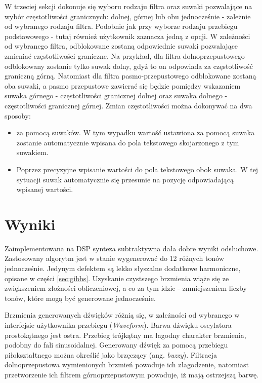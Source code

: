 W trzeciej sekcji dokonuje się wyboru rodzaju filtra oraz suwaki pozwalające na wybór częstotliwości granicznych: dolnej, górnej lub obu jednocześnie - zależnie od wybranego rodzaju filtra. Podobnie jak przy wyborze rodzaju przebiegu podstawowego - tutaj również użytkownik zaznacza jedną z opcji. W zależności od wybranego filtra, odblokowane zostaną odpowiednie suwaki pozwalające zmieniać częstotliwości graniczne. Na przykład, dla filtra dolnoprzepustowego odblokowany zostanie tylko suwak dolny, gdyż to on odpowiada za częstotliwość graniczną górną. Natomiast dla filtra pasmo-przepustowego odblokowane zostaną oba suwaki, a pasmo przepustowe zawierać się będzie pomiędzy wskazaniem suwaka górnego - częstotliwości granicznej dolnej oraz suwaka dolnego - częstotliwości granicznej górnej.
Zmian częstotliwości można dokonywać na dwa sposoby:
\begin{itemize}
	\item za pomocą suwaków. W tym wypadku wartość ustawiona za pomocą suwaka zostanie automatycznie wpisana do pola tekstowego skojarzonego z tym suwakiem.
	\item Poprzez precyzyjne wpisanie wartości do pola tekstowego obok suwaka. W tej sytuacji suwak automatycznie się przesunie na pozycję odpowiadającą wpisanej wartości.
\end{itemize}

\section{Wyniki}
Zaimplementowana na DSP synteza subtraktywna dała dobre wyniki odsłuchowe. Zastosowany algorytm jest w stanie wygenerować do 12 różnych tonów jednocześnie. Jedynym defektem są lekko słyszalne dodatkowe harmoniczne, opisane w części \ref{sec:gibbs}. Uzyskanie czystszego brzmienia wiąże się ze zwiększeniem złożności obliczeniowej, a co za tym idzie - zmniejszeniem liczby tonów, które mogą być generowane jednocześnie.

Brzmienia generowanych dźwięków różnią się, w zależności od wybranego w interfejsie użytkownika przebiegu (\emph{Waveform}). Barwa dźwięku oscylatora prostokątnego jest ostra. Przebieg trójkątny ma łagodny charakter brzmienia, podobny do fali sinusoidalnej. Generowany dźwięk za pomocą przebiegu piłokształtnego można określić jako brzęczący (ang. \emph{buzzy}). Filtracja dolnoprzepustowa wymienionych brzmień powoduje ich złagodzenie, natomiast przetworzenie ich filtrem górnoprzepustowym powoduje, iż mają ostrzejszą barwę.
